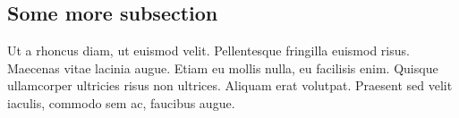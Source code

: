 \subsection{Some more subsection}
Ut a rhoncus diam, ut euismod velit. Pellentesque fringilla euismod risus. Maecenas vitae lacinia augue. Etiam eu mollis nulla, eu facilisis enim. Quisque ullamcorper ultricies risus non ultrices. Aliquam erat volutpat. Praesent sed velit iaculis, commodo sem ac, faucibus augue.\cite{rbb2010}\\